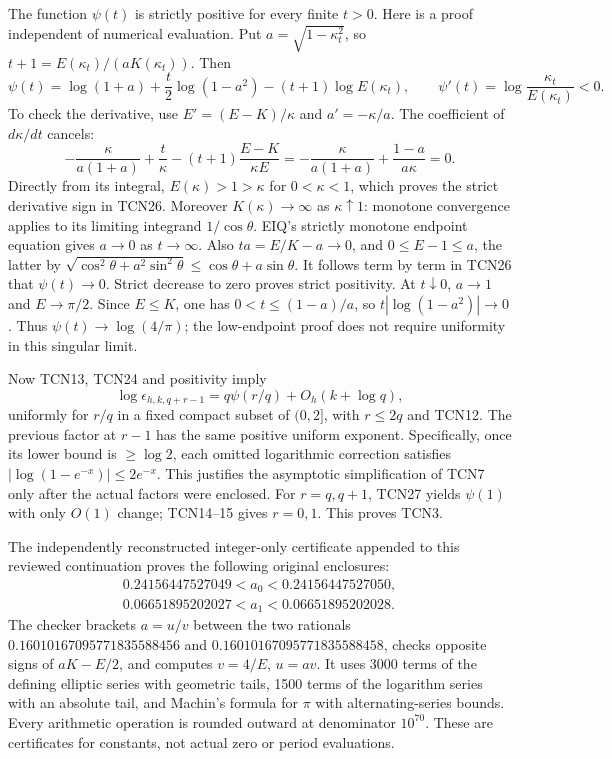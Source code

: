 \documentclass[11pt,a4paper]{article}
\begin{document}
The function $\psi(t)$ is strictly positive for every finite $t>0$.
Here is a proof independent of numerical evaluation. Put
$a=\sqrt{1-\kappa_t^2}$, so $t+1=E(\kappa_t)/(aK(\kappa_t))$.
Then
\begin{equation}\tag{TCN26}
 \psi(t)=\log(1+a)+\frac t2\log(1-a^2)-(t+1)\log E(\kappa_t),
 \qquad \psi'(t)=\log\frac{\kappa_t}{E(\kappa_t)}<0.
\end{equation}
To check the derivative, use $E'=(E-K)/\kappa$ and
$a'=-\kappa/a$. The coefficient of $d\kappa/dt$ cancels:
\[
 -\frac{\kappa}{a(1+a)}+\frac t\kappa
 -(t+1)\frac{E-K}{\kappa E}
 =-\frac{\kappa}{a(1+a)}+\frac{1-a}{a\kappa}=0.
\]
Directly from its integral, $E(\kappa)>1>\kappa$ for $0<\kappa<1$,
which proves the strict derivative sign in TCN26. Moreover
$K(\kappa)\to\infty$ as $\kappa\uparrow1$: monotone convergence
applies to its limiting integrand $1/\cos\theta$.
EIQ's strictly monotone endpoint equation gives $a\to0$ as $t\to\infty$.
Also $ta=E/K-a\to0$, and $0\le E-1\le a$, the latter by
$\sqrt{\cos^2\theta+a^2\sin^2\theta}\le\cos\theta+a\sin\theta$.
It follows term by term in TCN26 that $\psi(t)\to0$.
Strict decrease to zero proves strict positivity. At $t\downarrow0$,
$a\to1$ and $E\to\pi/2$. Since $E\le K$, one has
$0<t\le(1-a)/a$, so $t|\log(1-a^2)|\to0$.
Thus $\psi(t)\to\log(4/\pi)$; the low-endpoint proof does not require
uniformity in this singular limit.

Now TCN13, TCN24 and positivity imply
\begin{equation}\tag{TCN27}
 \log\epsilon_{h,k,q+r-1}=q\psi(r/q)+O_h(k+\log q),
\end{equation}
uniformly for $r/q$ in a fixed compact subset of $(0,2]$, with
$r\le2q$ and TCN12. The previous factor at $r-1$ has the same
positive uniform exponent. Specifically, once its lower bound is
$\ge\log2$, each omitted logarithmic correction satisfies
$|\log(1-e^{-x})|\le2e^{-x}$. This justifies the asymptotic
simplification of TCN7 only after the actual factors were enclosed.
For $r=q,q+1$, TCN27 yields $\psi(1)$ with only $O(1)$ change;
TCN14--15 gives $r=0,1$. This proves TCN3.

The independently reconstructed integer-only certificate appended to
this reviewed continuation proves the following original enclosures:
\begin{equation}\tag{TCN28}
 \begin{gathered}
 0.24156447527049<a_0<0.24156447527050,\\
 0.06651895202027<a_1<0.06651895202028.
 \end{gathered}
\end{equation}
The checker brackets $a=u/v$ between the two rationals
$0.16010167095771835588456$ and $0.16010167095771835588458$,
checks opposite signs of $aK-E/2$, and computes $v=4/E$, $u=av$.
It uses 3000 terms of the defining elliptic series with geometric tails,
1500 terms of the logarithm series with an absolute tail, and Machin's
formula for $\pi$ with alternating-series bounds. Every arithmetic
operation is rounded outward at denominator $10^{70}$. These are
certificates for constants, not actual zero or period evaluations.
\end{document}

